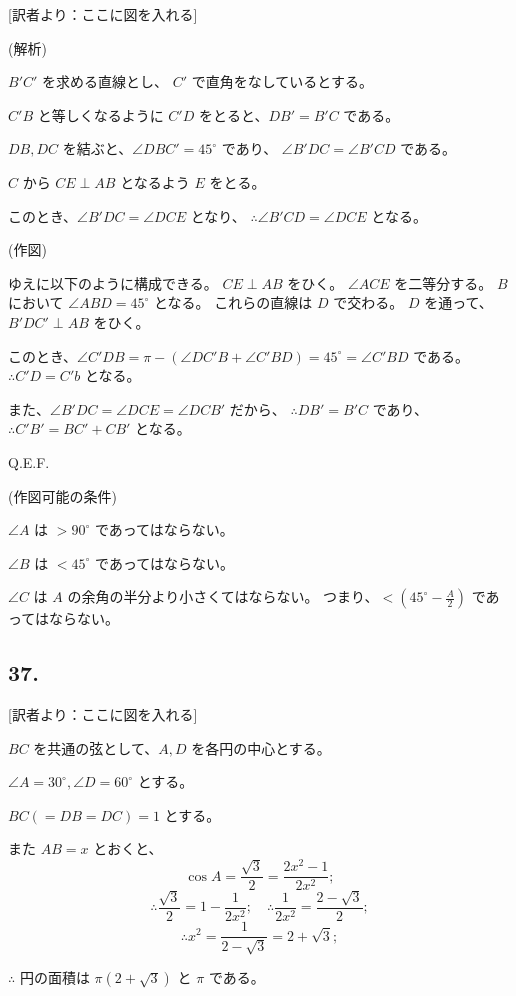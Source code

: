 [訳者より：ここに図を入れる] 

(解析)

$B'C'$ を求める直線とし、
$C'$ で直角をなしているとする。

$C'B$ と等しくなるように $C'D$ をとると、$DB' = B'C$ である。

$DB, DC$ を結ぶと、$\angle DBC' = 45^\circ$ であり、
$\angle B'DC = \angle B'CD$ である。

$C$ から $CE \perp AB$ となるよう $E$ をとる。

このとき、$\angle B'DC = \angle DCE$ となり、
$\therefore \angle B'CD = \angle DCE$ となる。

(作図)

ゆえに以下のように構成できる。
$CE \perp AB$ をひく。
$\angle ACE$ を二等分する。
$B$ において $\angle ABD = 45^\circ$ となる。
これらの直線は $D$ で交わる。
$D$ を通って、$B'DC' \perp AB$ をひく。

このとき、$\angle C'DB = \pi - (\angle DC'B + \angle C'BD) = 45^\circ
= \angle C'BD$ である。
$\therefore C'D = C'b$ となる。

また、$\angle B'DC = \angle DCE = \angle DCB'$ だから、
$\therefore DB' = B'C$ であり、
$\therefore C'B' = BC' + CB'$ となる。

Q.E.F.

(作図可能の条件)

$\angle A$ は $> 90^\circ$ であってはならない。

$\angle B$ は $< 45^\circ$ であってはならない。

$\angle C$ は $A$ の余角の半分より小さくてはならない。
つまり、$ < (45^\circ - \frac{A}{2})$ であってはならない。


\subsection*{37.}

[訳者より：ここに図を入れる]

$BC$ を共通の弦として、$A, D$ を各円の中心とする。

$\angle A = 30^\circ, \angle D = 60^\circ$ とする。

$BC ( = DB = DC) = 1$ とする。

また $AB = x$ とおくと、
\[
\cos A = \frac{\sqrt{3}}{2} = \frac{2x^2 - 1}{2 x^2};
\]
\[
\therefore
\frac{\sqrt{3}}{2} = 1 - \frac{1}{2x^2};
\quad
\therefore
\frac{1}{2x^2} = \frac{2 - \sqrt{3}}{2};
\]
\[
\therefore
x^2 = \frac{1}{2 - \sqrt{3}} = 2 + \sqrt{3};
\]

$\therefore$ 円の面積は $\pi (2 + \sqrt{3})$ と $\pi$ である。

